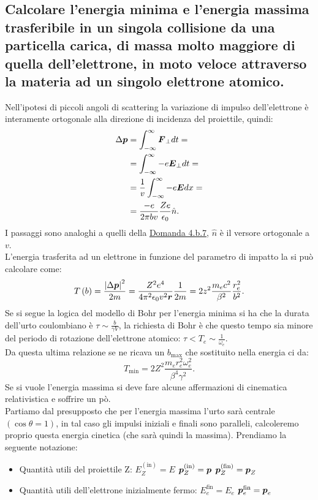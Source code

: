 \subsection[\hspace{1mm} Energia massima e minima trasferibile per singola collisione]{Calcolare l’energia minima e l'energia massima trasferibile in un singola collisione da una particella carica, di massa molto maggiore di quella dell'elettrone, in moto veloce attraverso la materia ad un singolo elettrone atomico.
}
\label{sec:4.b.14}
Nell'ipotesi di piccoli angoli di scattering la variazione di impulso dell'elettrone è interamente ortogonale alla direzione di incidenza del proiettile, quindi:
\begin{align*}
	\Delta \boldsymbol{p}&= \int_{-\infty}^{\infty} \boldsymbol{F}_{\bot} dt =\\
	&=  \int_{-\infty}^{\infty}-e \boldsymbol{E}_{\bot}dt =\\
	&= \frac{1}{v}\int_{-\infty}^{\infty}-e \boldsymbol{E}dx=\\
	&= \frac{-e}{2\pi b v} \frac{Ze}{\epsilon_0} \hat{n} 
.\end{align*}
I passaggi sono analoghi a quelli della \hyperref[sec:4.b.7]{Domanda 4.b.7}, $\hat{n}$ è il versore ortogonale a $v$.\\
L'energia trasferita ad un elettrone in funzione del parametro di impatto la si può calcolare come:
\[
	T\left( b \right)= \frac{\left| \Delta \boldsymbol{p} \right|^2 }{2m}= \frac{Z^2e^4}{4\pi^2\epsilon_0 v^2 \boldsymbol{r}}\frac{1}{2m}= 
	2z^2 \frac{m_e c^2}{\beta^2} \frac{r_e^2}{b ^2}
.\] 
Se si segue la logica del modello di Bohr per l'energia minima si ha che la durata dell'urto coulombiano è $\tau \sim \frac{b}{\gamma V}$, la richiesta di Bohr è che questo tempo sia minore del periodo di rotazione dell'elettrone atomico: $\tau< T_{e} \sim \frac{1}{\omega_{e}}$.\\
Da questa ultima relazione se ne ricava un $b_{\text{max}}$ che sostituito nella energia ci da:
\[
	T_{\text{min}}= 2Z^2 \frac{m_e r_e^2 \omega_e^2}{\beta^4 \gamma^2}
.\] 
Se si vuole l'energia massima si deve fare alcune affermazioni di cinematica relativistica e soffrire un pò. \\
Partiamo dal presupposto che per l'energia massima l'urto sarà centrale $\left( \cos\theta = 1 \right)$, in tal caso gli impulsi iniziali e finali sono paralleli, calcoleremo proprio questa energia cinetica (che sarà quindi la massima). Prendiamo la seguente notazione:
\begin{itemize}
	\item Quantità utili del proiettile Z: \hspace{2cm}  $E_{Z}^{\left(\text{in}\right)} = E$ \hspace{2cm} $\boldsymbol{p}_{Z}^{\left( \text{in} \right) } = \boldsymbol{p}$ 
		\hspace{2cm} $\boldsymbol{p}_{Z}^{\left( \text{fin} \right) }=\boldsymbol{p}_{Z}$
	\item Quantità utili dell'elettrone inizialmente fermo:  \hspace{2cm} $E_{e}^{\text{fin}}= E_{e}$ \hspace{2cm} $\boldsymbol{p}_{e}^{\text{fin}}=\boldsymbol{p}_{e}$
\end{itemize}
